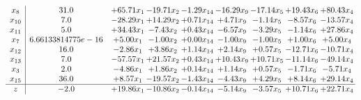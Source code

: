 \documentclass[9pt]{article}
\begin{document}
\[\begin{array}{c| c c@{\hskip 2pt} c@{\hskip 2pt} c@{\hskip 2pt} c@{\hskip 2pt} c@{\hskip 2pt} c@{\hskip 2pt} c@{\hskip 2pt} }
 x_{8}   &  31.0 & + 65.71 x_{1} & -19.71 x_{2} & -1.29 x_{14} & -16.29 x_{9} & -17.14 x_{5} & + 19.43 x_{6} & + 80.43 x_{4}\\
 x_{10}   &  7.0 & -28.29 x_{1} & + 14.29 x_{2} & +  0.71 x_{14} & +  4.71 x_{9} & -1.14 x_{5} & -8.57 x_{6} & -13.57 x_{4}\\
 x_{11}   &  5.0 & + 34.43 x_{1} & -7.43 x_{2} & +  0.43 x_{14} & -6.57 x_{9} & -3.29 x_{5} & -1.14 x_{6} & + 27.86 x_{4}\\
 x_{7}   &  6.66133814775e-16 & +  5.00 x_{1} & -1.00 x_{2} & +  0.00 x_{14} & -1.00 x_{9} & -1.00 x_{5} & +  1.00 x_{6} & +  5.00 x_{4}\\
 x_{12}   &  16.0 & -2.86 x_{1} & +  3.86 x_{2} & +  1.14 x_{14} & +  2.14 x_{9} & +  0.57 x_{5} & -12.71 x_{6} & -10.71 x_{4}\\
 x_{13}   &  7.0 & -57.57 x_{1} & + 21.57 x_{2} & +  0.43 x_{14} & + 10.43 x_{9} & + 10.71 x_{5} & -11.14 x_{6} & -49.14 x_{4}\\
 x_{3}   &  2.0 & -4.86 x_{1} & +  1.86 x_{2} & +  0.14 x_{14} & +  1.14 x_{9} & +  0.57 x_{5} & -1.71 x_{6} & -5.71 x_{4}\\
 x_{15}   &  36.0 & +  8.57 x_{1} & -19.57 x_{2} & -1.43 x_{14} & -4.43 x_{9} & +  4.29 x_{5} & +  8.14 x_{6} & + 29.14 x_{4}\\
\hline
z    &  -2.0 & + 19.86 x_{1} & -10.86 x_{2} & -0.14 x_{14} & -5.14 x_{9} & -3.57 x_{5} & + 10.71 x_{6} & + 22.71 x_{4}\\
\end{array}\]
\end{document}
